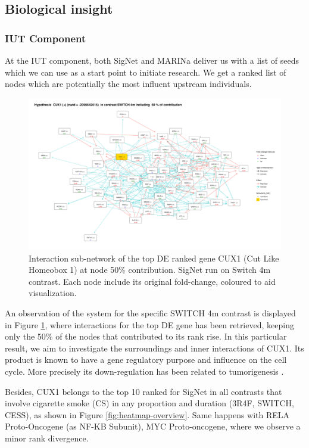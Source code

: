 \subsection{Biological insight}
\subsubsection{IUT Component}
At the IUT component, both SigNet and MARINa deliver us with a list of seeds which we can use as a start point to initiate research. We get a ranked list of nodes which are potentially the most influent upstream individuals.
\\

\begin{figure}[!h]
    \centering
    \includegraphics[width=\textwidth, height=\textheight, keepaspectratio]{Major Thesis/figures/iut/graph/SWITCH4m50-CUX1.png}
    \caption{Interaction sub-network of the top DE ranked gene CUX1 (Cut Like Homeobox 1) at node 50\% contribution. SigNet run on Switch 4m contrast. Each node include its original fold-change, coloured to aid visualization.}
    \label{fig:graph-expansion}
\end{figure}

An observation of the system for the specific SWITCH 4m contrast is displayed in Figure \ref{fig:graph-expansion}, where interactions for the top DE gene has been retrieved, keeping only the 50\% of the nodes that contributed to its rank rise. In this particular result, we aim to investigate the surroundings and inner interactions of CUX1. Its product is known to have a gene regulatory purpose and influence on the cell cycle. More precisely its down-regulation has been related to tumorigenesis \cite{Wong2014InactivatingTumorigenesis}.


Besides, CUX1 belongs to the top 10 ranked for SigNet in all contrasts that involve cigarette smoke (CS) in any proportion and duration (3R4F, SWITCH, CESS), as shown in Figure \ref{fig:heatmap-overview}. Same happens with RELA Proto-Oncogene (as NF-KB Subunit), MYC Proto-oncogene, where we observe a minor rank divergence.
\\

